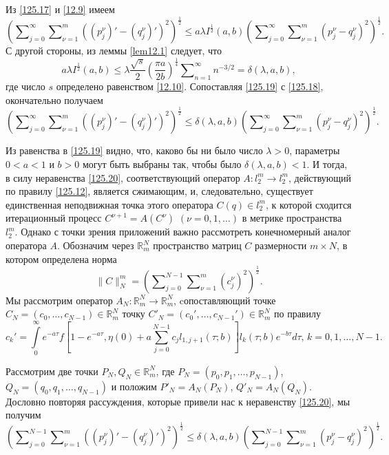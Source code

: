 Из  \eqref{125.17}  и \eqref{12.9} имеем
\begin{equation}\label{125.18}
\left(\sum\nolimits_{j=0}^\infty\sum\nolimits_{\nu=1}^m((p^\nu_j)'-(q^\nu_j)')^2\right)^\frac12\le a\lambda I^\frac12(a,b) \left(\sum\nolimits_{j=0}^\infty\sum\nolimits_{\nu=1}^m( p^\nu_j-q^\nu_j)^2\right)^\frac12.
\end{equation}
С другой стороны, из леммы \ref{lem12.1} следует, что
\begin{equation}\label{125.19}
a\lambda I^\frac12(a,b)\le\lambda \frac{\sqrt{s}}2\left(\frac{\pi a}{2b}\right)^\frac14 \sum\nolimits_{n=1}^\infty n^{-3/2}=\delta(\lambda,a,b),
\end{equation}
где число $s$ определено равенством \eqref{12.10}. Сопоставляя \eqref{125.19} с \eqref{125.18}, окончательно получаем
\begin{equation}\label{125.20}
\left(\sum\nolimits_{j=0}^\infty\sum\nolimits_{\nu=1}^m((p^\nu_j)'-(q^\nu_j)')^2\right)^\frac12\le \delta(\lambda,a,b)\left(\sum\nolimits_{j=0}^\infty\sum\nolimits_{\nu=1}^m( p^\nu_j-q^\nu_j)^2\right)^\frac12.
\end{equation}

Из равенства в \eqref{125.19} видно, что, каково бы ни было число $\lambda>0$, параметры $0<a<1$ и $b>0$ могут быть выбраны так, чтобы было $\delta(\lambda,a,b)<1$. И тогда, в силу неравенства \eqref{125.20}, соответствующий оператор $A:l^m_2\to l_2^m$, действующий по правилу \eqref{125.12}, является сжимающим, и, следовательно, существует единственная неподвижная точка этого оператора $C(q)\in l^m_2$, к которой сходится итерационный процесс $C^{\nu+1}=A(C^\nu)$ $(\nu=0,1,\ldots)$ в метрике пространства $l^m_2$.
Однако с точки зрения приложений важно рассмотреть конечномерный аналог оператора $A$. Обозначим через $\mathbb{R}^N_m$ пространство матриц $C$ размерности $m\times N$, в котором определена норма
$$\|C\|_N^m=\left(\sum\nolimits_{j=0}^{N-1} \sum\nolimits_{\nu=1}^{m}(c_j^\nu)^2\right)^\frac12.$$
Мы рассмотрим оператор $A_N:\mathbb{R}^N_m\to \mathbb{R}^N_m$, cопоставляющий точке\\
$C_N=(c_0,\ldots,c_{N-1})\in \mathbb{R}^N_m $ точку  $C'_N=(c_0',\ldots,c_{N-1}')\in \mathbb{R}^N_m $ по правилу
\begin{equation}\label{125.21}
c_k'=\int\limits_{0}^\infty e^{-a\tau}f\left[1-e^{-a\tau},\eta(0)+ a\sum_{j=0}^{N-1} c_jl_{1,j+1}(\tau;b)\right]l_k(\tau;b)e^{-b\tau} d\tau,\,k=0,1,\ldots, N-1.
\end{equation}

Рассмотрим две точки $P_N,Q_N\in \mathbb{R}^N_m$, где $P_N=(p_0,p_1,\ldots, p_{N-1})$,\\   $Q_N=(q_0,q_1,\ldots, q_{N-1})$ и положим $P'_N=A_N(P_N)$, $Q'_N=A_N(Q_N)$. Дословно повторяя рассуждения, которые привели нас к неравенству \eqref{125.20}, мы получим
\begin{equation}\label{125.22}
\left(\sum\nolimits_{j=0}^{N-1}\sum\nolimits_{\nu=1}^m((p^\nu_j)'-(q^\nu_j)')^2\right)^\frac12\le \delta(\lambda,a,b)\left(\sum\nolimits_{j=0}^{N-1}\sum\nolimits_{\nu=1}^m( p^\nu_j-q^\nu_j)^2\right)^\frac12.
\end{equation}

